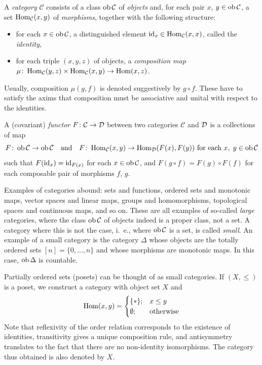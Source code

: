 \documentclass[a4paper,openany]{scrbook}
\renewcommand{\C}{\mathcal C}
\begin{document}
\begin{defn}
A \emph{category} $\C$ consists of a class $\ob \C$ of \emph{objects} and, for each pair $x$, $y \in \ob \C$, a set $\Hom_\C(x,y)$ of \emph{morphisms}, together with the following structure:
\begin{itemize}
\item for each $x \in \ob \C$, a distinguished element $\id_x \in \Hom_\C(x,x)$, called the \emph{identity},
\item for each triple $(x,y,z)$ of objects, a \emph{composition map} $\mu\colon \Hom_\C(y,z) \times \Hom_\C(x,y) \to \Hom(x,z)$.
\end{itemize}
Usually, composition $\mu(g,f)$ is denoted suggestively by $g \circ f$.
These have to satisfy the axims that composition must be associative and unital with respect to the identities.

A (covariant) \emph{functor} $F\colon \C \to \D$ between two categories $\C$ and $\mathcal D$ is a collections of map
\[
F\colon \ob \C \to \ob \C \quad \text{and} \quad F\colon \Hom_\C(x,y) \to \Hom_\D(F(x),F(y)) \text{ for each } x,\;y \in \ob \C
\]
such that $F(\operatorname{id}_x) = \operatorname{id}_{F(x)}$ for each $x \in \ob \C$, and $F(g \circ f) = F(g) \circ F(f)$ for each composable pair of morphisms $f$, $g$.
\end{defn}

Examples of categories abound: sets and functions, ordered sets and monotonic maps, vector spaces and linear maps, groups and homomorphisms, topological spaces and continuous maps, and so on. These are all examples of so-called \emph{large} categories, where the class $\ob \C$ of objects indeed is a proper class, not a set. A category where this is not the case, i.~e., where $\ob \C$ is a set, is called \emph{small}. An example of a small category is the category $\Delta$ whose objects are the totally ordered sets $[n] = \{0,\dots,n\}$ and whose morphisms are monotonic maps. In this case, $\operatorname{ob} \Delta$ is countable.

\begin{example} \label{exa:posetcat}
Partially ordered sets (posets) can be thought of as small categories. If $(X,\leq)$ is a poset, we construct a category with object set $X$ and
\[
\operatorname{Hom}(x,y) = \begin{cases} \{*\};& x \leq y\\ \emptyset; &\text{otherwise}\end{cases}
\]
Note that reflexivity of the order relation corresponds to the existence of identities, transitivity gives a unique composition rule, and antisymmetry translates to the fact that there are no non-identity isomorphisms. The category thus obtained is also denoted by $X$.
\end{example}
\end{document}
